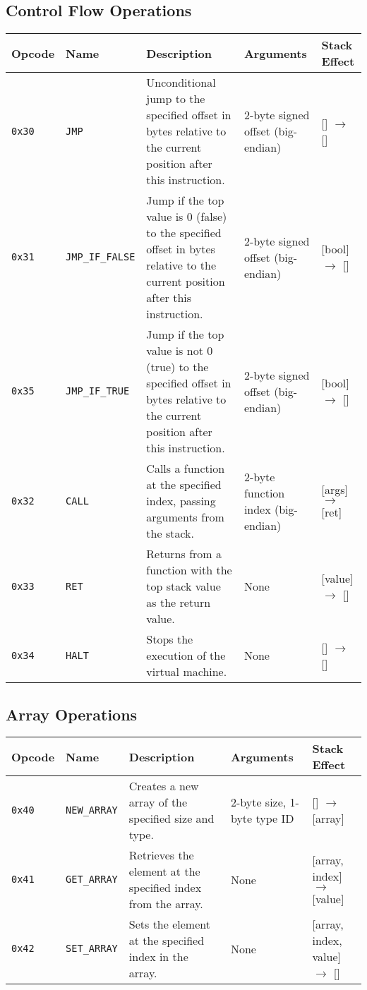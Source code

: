 \documentclass[a4paper,12pt]{article}
\begin{document}
\subsection{Control Flow Operations}
\begin{tabular}{|l|l|p{4cm}|l|l|}
\hline
\textbf{Opcode} & \textbf{Name} & \textbf{Description} & \textbf{Arguments} & \textbf{Stack Effect} \\ \hline
\texttt{0x30} & \texttt{JMP} & Unconditional jump to the specified offset in bytes relative to the current position after this instruction. & 2-byte signed offset (big-endian) & [] $\rightarrow$ [] \\ \hline
\texttt{0x31} & \texttt{JMP\_IF\_FALSE} & Jump if the top value is 0 (false) to the specified offset in bytes relative to the current position after this instruction. & 2-byte signed offset (big-endian) & [bool] $\rightarrow$ [] \\ \hline
\texttt{0x35} & \texttt{JMP\_IF\_TRUE} & Jump if the top value is not 0 (true) to the specified offset in bytes relative to the current position after this instruction. & 2-byte signed offset (big-endian) & [bool] $\rightarrow$ [] \\ \hline
\texttt{0x32} & \texttt{CALL} & Calls a function at the specified index, passing arguments from the stack. & 2-byte function index (big-endian) & [args] $\rightarrow$ [ret] \\ \hline
\texttt{0x33} & \texttt{RET} & Returns from a function with the top stack value as the return value. & None & [value] $\rightarrow$ [] \\ \hline
\texttt{0x34} & \texttt{HALT} & Stops the execution of the virtual machine. & None & [] $\rightarrow$ [] \\ \hline
\end{tabular}
\label{tab:control_flow_operations}

\subsection{Array Operations}
\begin{tabular}{|l|l|p{2.5cm}|l|l|}
\hline
\textbf{Opcode} & \textbf{Name} & \textbf{Description} & \textbf{Arguments} & \textbf{Stack Effect} \\ \hline
\texttt{0x40} & \texttt{NEW\_ARRAY} & Creates a new array of the specified size and type. & 2-byte size, 1-byte type ID & [] $\rightarrow$ [array] \\ \hline
\texttt{0x41} & \texttt{GET\_ARRAY} & Retrieves the element at the specified index from the array. & None & [array, index] $\rightarrow$ [value] \\ \hline
\texttt{0x42} & \texttt{SET\_ARRAY} & Sets the element at the specified index in the array. & None & [array, index, value] $\rightarrow$ [] \\ \hline
\end{tabular}
\label{tab:array_operations}
\end{document}
